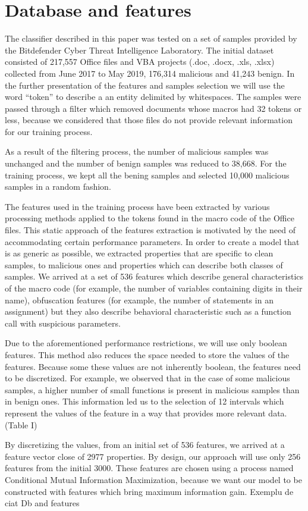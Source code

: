 \section{Database and features}
\par
The classifier described in this paper was tested on a set of samples provided by the Bitdefender Cyber Threat Intelligence Laboratory. The initial dataset consisted of 217,557 Office files and VBA projects (.doc, .docx, .xls, .xlsx) collected from June 2017 to May 2019, 176,314 malicious and 41,243 benign. In the further presentation of the features and samples selection we will use the word “token” to describe a an entity delimited by whitespaces. The samples were passed through a filter which removed documents whose macros had 32 tokens or less, because we considered that those files do not provide relevant information for our training process.
\par
As a result of the filtering process, the number of malicious samples was unchanged and the number of benign samples was reduced to 38,668. For the training process, we kept all the bening samples and selected 10,000 malicious samples in a random fashion.
\par
The features used in the training process have been extracted by various processing methods applied to the tokens found in the macro code of the Office files. This static approach of the features extraction is motivated by the need of accommodating certain performance parameters. In order to create a model that is as generic as possible, we extracted properties that are specific to clean samples, to malicious ones and properties which can describe both classes of samples. We arrived at a set of 536 features which describe general characteristics of the macro code (for example, the number of variables containing digits in their name), obfuscation features (for example, the number of statements in an assignment) but they also describe behavioral characteristic such as a function call with suspicious parameters.
\par
Due to the aforementioned performance restrictions, we will use only boolean features. This method also reduces the space needed to store the values of the features. Because some these values are not inherently boolean, the features need to be discretized. For example, we observed that in the case of some malicious samples, a higher number of small functions is present in malicious samples than in benign ones. This information led us to the selection of 12 intervals which represent the values of the feature in a way that provides more relevant data. (Table I)
\par
By discretizing the values, from an initial set of 536 features, we arrived at a feature vector close of 2977 properties. By design, our approach will use only 256 features from the initial 3000. These features are chosen using a process named Conditional Mutual Information Maximization, because we want our model to be constructed with features which bring maximum information gain.
Exemplu de ciat \cite{MicrosoftURL}
Db and features